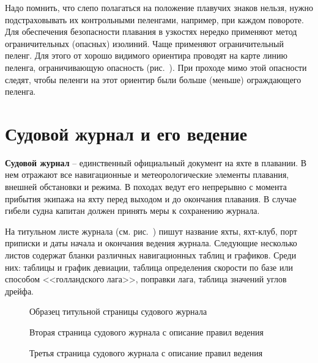 Надо помнить, что слепо полагаться на положение плавучих знаков
нельзя, нужно подстраховывать их контрольными пеленгами, например, при
каждом повороте. Для обеспечения безопасности плавания в узкостях
нередко применяют метод ограничительных (опасных) изолиний. Чаще
применяют ограничительный пеленг. Для этого от хорошо видимого
ориентира проводят на карте линию пеленга, ограничивающую опасность
(рис.~). При проходе мимо этой опасности следят, чтобы
пеленги на этот ориентир были больше (меньше) ограждающего пеленга.

\section{Судовой журнал и его ведение}

\textbf{Судовой журнал} \--- единственный официальный документ на яхте
в плавании. В нем отражают все навигационные и метеорологические
элементы плавания, внешней обстановки и режима. В походах ведут его
непрерывно с момента прибытия экипажа на яхту перед выходом и до
окончания плавания. В случае гибели судна капитан должен принять меры
к сохранению журнала.
 
На титульном листе журнала (см. рис.~) пишут название
яхты, яхт-клуб, порт приписки и даты начала и окончания ведения
журнала. Следующие несколько листов содержат бланки различных
навигационных таблиц и графиков. Среди них: таблицы и график девиации,
таблица определения скорости по базе или способом <<голландского
лага>>, поправки лага, таблица значений углов дрейфа.

\begin{figure}[htb]
  \centering{}
  \caption{Образец титульной страницы судового журнала}
  \label{fig:j-title}
\end{figure} 

\begin{figure}[htb]
  \begin{minipage}{0.49\textwidth}
    \centering{}
    \caption{Вторая страница судового журнала с описание правил ведения}
    \label{fig:j-page-1}
  \end{minipage}
  \hfill\hfill
  \begin{minipage}{0.49\textwidth}
    \centering{}
    \caption{Третья страница судового журнала с описание правил ведения}
    \label{fig:j-page-2}
  \end{minipage}
\end{figure} 

